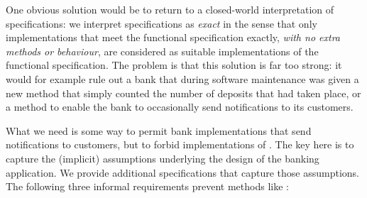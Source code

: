 One obvious solution would be to return to a closed-world
interpretation of specifications: we interpret  specifications  
as \emph{exact} in the sense that only
implementations that meet the functional specification exactly,
\emph{with no extra methods or behaviour}, are considered as suitable
implementations of the functional specification. The problem is that
this solution is far too strong: it would for example rule out a bank
that  during software maintenance was given a new method 
that simply counted the number of deposits that had taken place, or a method 
to enable the bank to occasionally send notifications  to its customers.
%
%


What we need is some way to permit bank implementations that 
send notifications to customers, but to forbid implementations of . %
The key here is to capture the (implicit)
assumptions underlying %
the design of the banking application.
 We provide
additional specifications that capture those assumptions.  The following
 three informal requirements   prevent methods like :

